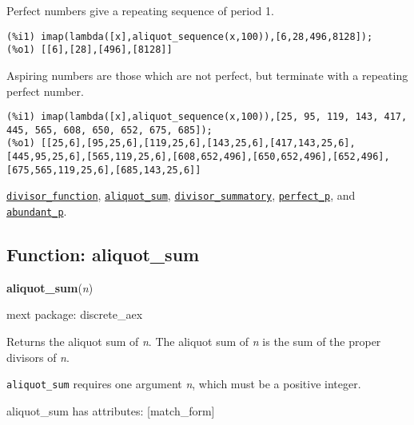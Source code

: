 \documentclass[]{article}
\begin{document}
\vspace{5 pt}


   Perfect numbers give a repeating sequence of period 1. 

\begin{Verbatim}[frame=single]
(%i1) imap(lambda([x],aliquot_sequence(x,100)),[6,28,496,8128]);
(%o1) [[6],[28],[496],[8128]]
\end{Verbatim}

   Aspiring numbers are those which are not perfect, but terminate with a 
   repeating perfect number. 

\begin{Verbatim}[frame=single]
(%i1) imap(lambda([x],aliquot_sequence(x,100)),[25, 95, 119, 143, 417, 445, 565, 608, 650, 652, 675, 685]);
(%o1) [[25,6],[95,25,6],[119,25,6],[143,25,6],[417,143,25,6],[445,95,25,6],[565,119,25,6],[608,652,496],[650,652,496],[652,496],[675,565,119,25,6],[685,143,25,6]]
\end{Verbatim}


  \hyperlink{divisor_function}{{\tt divisor\_function}}, \hyperlink{aliquot_sum}{{\tt aliquot\_sum}}, \hyperlink{divisor_summatory}{{\tt divisor\_summatory}}, \hyperlink{perfect_p}{{\tt perfect\_p}}, and \hyperlink{abundant_p}{{\tt abundant\_p}}.

\vspace{5 pt}


\subsection{Function: aliquot\_sum\label{sec:aliquot_sum}}
\hypertarget{aliquot_sum}{}
{\bf aliquot\_sum}({\it n})


\noindent mext package: discrete\_aex



\vspace{5 pt}
Returns the aliquot sum of {\it n}. The aliquot sum of {\it n} is the sum of the proper divisors of {\it n}. 

\vspace{5 pt}

   {\tt aliquot\_sum} requires one argument {\it n}, which must be a positive integer.


\vspace{5 pt}

aliquot\_sum has attributes: [match\_form]
\end{document}
